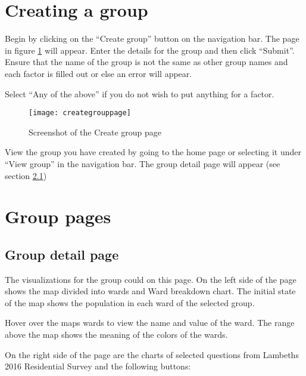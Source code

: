 \section{Creating a group}

Begin by clicking on the ``Create group'' button on the navigation bar. The page in figure \ref{fig:creategrouppage} will appear. Enter the details for the group and then click ``Submit''. Ensure that the name of the group is not the same as other group names and each factor is filled out or else an error will appear.\par 

Select ``Any of the above'' if you do not wish to put anything for a factor.\par

\begin{figure}[h]
\centering
\texttt{[image: creategrouppage]}
\caption{Screenshot of the Create group page}
\label{fig:creategrouppage}
\end{figure}

View the group you have created by going to the home page or selecting it under ``View group'' in the navigation bar. The group detail page will appear (see section \ref{sec:groupdetailpage})

\section{Group pages} 

\subsection{Group detail page}
\label{sec:groupdetailpage}

The visualizations for the group could on this page. On the left side of the page shows the map divided into wards and Ward breakdown chart. The initial state of the map shows the population in each ward of the selected group. 

Hover over the map\textsc{}s wards to view the name and value of the ward. The range above the map shows the meaning of the colors of the wards.

On the right side of the page are the charts of selected questions from Lambeth\textsc{}s 2016 Residential Survey and the following buttons:

